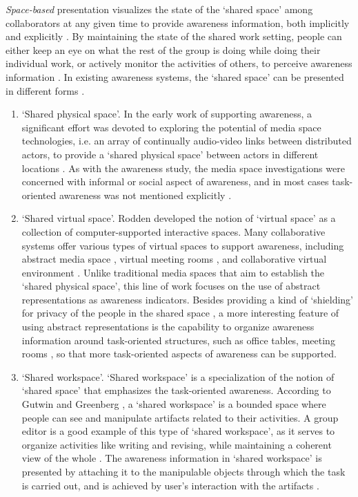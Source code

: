 \emph{Space-based} presentation visualizes the state of the `shared space' among collaborators at any given time to provide awareness information, both implicitly and explicitly \cite{dourish1992awareness}. By maintaining the state of the shared work setting, people can either keep an eye on what the rest of the group is doing while doing their individual work, or actively monitor the activities of others, to perceive awareness information \cite{simone2002a}. In existing awareness systems, the `shared space' can be presented in different forms \cite{antunes2010a}. 
\begin{enumerate}
	\item `Shared physical space'. In the early work of supporting awareness, a significant effort was devoted to exploring the potential of media space technologies, i.e. an array of continually audio-video links between distributed actors, to provide a `shared physical space' between actors in different locations \cite{Dourish1992}. As with the awareness study, the media space investigations were concerned with informal or social aspect of awareness, and in most cases task-oriented awareness was not mentioned explicitly \cite{schmidt2002a}.
	\item `Shared virtual space'. Rodden \cite{Rodden1996} developed the notion of `virtual space' as a collection of computer-supported interactive spaces. Many collaborative systems offer various types of virtual spaces to support awareness, including abstract media space \cite{Pedersen1997}, virtual meeting rooms \cite{Berlage1999}, and collaborative virtual environment \cite{Benford2001}. Unlike traditional media spaces that aim to establish the `shared physical space', this line of work focuses on the use of abstract representations as awareness indicators. Besides providing a kind of `shielding' for privacy of the people in the shared space \cite{Pedersen1997}, a more interesting feature of using abstract representations is the capability to organize awareness information around task-oriented structures, such as office tables, meeting rooms \cite{Berlage1999}, so that more task-oriented aspects of awareness can be supported.
	\item `Shared workspace'. `Shared workspace' is a specialization of the notion of `shared space' that emphasizes the task-oriented awareness. According to Gutwin and Greenberg \cite{Gutwin2002}, a `shared workspace' is a bounded space where people can see and manipulate artifacts related to their activities. A group editor is a good example of this type of `shared workspace', as it serves to organize activities like writing and revising, while maintaining a coherent view of the whole \cite{dourish1992awareness}. The awareness information in `shared workspace' is presented by attaching it to the manipulable objects through which the task is carried out, and is achieved by user's interaction with the artifacts \cite{Gutwin2002}.
\end{enumerate}

